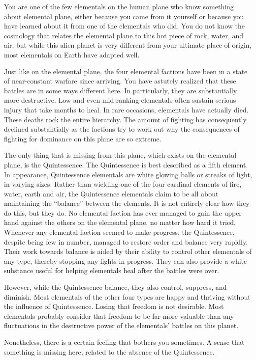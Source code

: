 \documentclass[blue]{elementals}
\begin{document}
\name{\bKnowQ{}}

You are one of the few elementals on the human plane who know something about elemental plane, either because you came from it yourself or because you have learned about it from one of the elementals who did.  You do not know the cosmology that relates the elemental plane to this hot piece of rock, water, and air, but while this alien planet is very different from your ultimate place of origin, most elementals on Earth have adapted well.

Just like on the elemental plane, the four elemental factions have been in a state of near-constant warfare since arriving.  You have astutely realized that these battles are in some ways different here.  In particularly, they are substantially more destructive.  Low and even mid-ranking elementals often sustain serious injury that take months to heal.  In rare occasions, elementals have actually died.  These deaths rock the entire hierarchy.  The amount of fighting has consequently declined substantially as the factions try to work out why the consequences of fighting for dominance on this plane are so extreme.

The only thing that is missing from this plane, which exists on the elemental plane, is the Quintessence.  The Quintessence is best described as a fifth element.  In appearance, Quintessence elementals are white glowing balls or streaks of light, in varying sizes.  Rather than wielding one of the four cardinal elements of fire, water, earth and air, the Quintessence elementals claim to be all about maintaining the ``balance'' between the elements.  It is not entirely clear how they do this, but they do.  No elemental faction has ever managed to gain the upper hand against the others on the elemental plane, no matter how hard it tried.  Whenever any elemental faction seemed to make progress, the Quintessence, despite being few in number, managed to restore order and balance very rapidly.  Their work towards balance is aided by their ability to control other elementals of any type, thereby stopping any fights in progress.  They can also provide a white substance useful for helping elementals heal after the battles were over.

However, while the Quintessence balance, they also control, suppress, and diminish.  Most elementals of the other four types are happy and thriving without the influence of Quintessence.  Losing that freedom is not desirable.  Most elementals probably consider that freedom to be far more valuable than any fluctuations in the destructive power of the elementals' battles on this planet.

Nonetheless, there is a certain feeling that bothers you sometimes.  A sense that something is missing here, related to the absence of the Quintessence.
\end{document}
